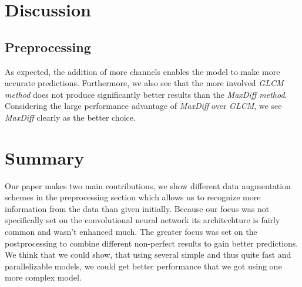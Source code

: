 \documentclass[10pt,conference,compsocconf]{IEEEtran}
\begin{document}
\section{Discussion}

\subsection{Preprocessing}
As expected, the addition of more channels enables the model to make more accurate predictions.
Furthermore, we also see that the more involved \emph{GLCM method} does not produce significantly better results than the \emph{MaxDiff method}.
Considering the large performance advantage of \emph{MaxDiff} over \emph{GLCM}, we see \emph{MaxDiff} clearly as the better choice.

\section{Summary}
Our paper makes two main contributions, we show different data augmentation schemes in the preprocessing section which allows us to recognize more information from the data than given initially. Because our focus was not specifically set on the convolutional neural network its architechture is fairly common and wasn't enhanced much. The greater focus was set on the postprocessing to combine different non-perfect results to gain better predictions. We think that we could show, that using several simple and thus quite fast and parallelizable models, we could get better performance that we got using one more complex model.



\end{document}
